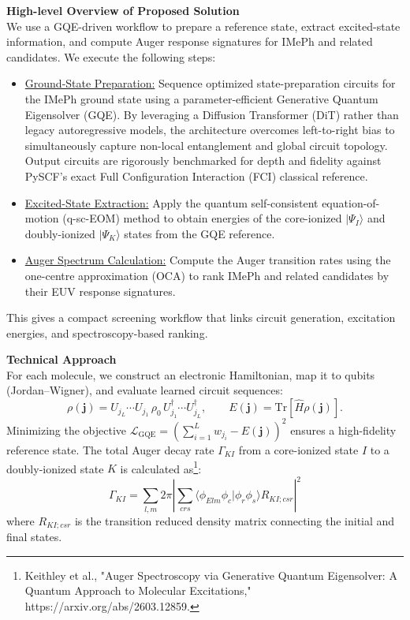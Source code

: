 \documentclass[11pt]{article}
\begin{document}
\noindent\textbf{High-level Overview of Proposed Solution}\\
We use a GQE-driven workflow to prepare a reference state, extract excited-state information, and compute Auger response signatures for IMePh and related candidates. We execute the following steps:
\begin{itemize}[leftmargin=*, itemsep=0pt, topsep=0pt, parsep=0pt, partopsep=0pt]
  \item \underline{Ground-State Preparation:} Sequence optimized state-preparation circuits for the IMePh ground state using a parameter-efficient Generative Quantum Eigensolver (GQE). By leveraging a Diffusion Transformer (DiT) rather than legacy autoregressive models, the architecture overcomes left-to-right bias to simultaneously capture non-local entanglement and global circuit topology. Output circuits are rigorously benchmarked for depth and fidelity against PySCF's exact Full Configuration Interaction (FCI) classical reference.
  \item \underline{Excited-State Extraction:} Apply the quantum self-consistent equation-of-motion (q-sc-EOM) method to obtain energies of the core-ionized $|\Psi_I\rangle$ and doubly-ionized $|\Psi_K\rangle$ states from the GQE reference.
  \item \underline{Auger Spectrum Calculation:} Compute the Auger transition rates using the one-centre approximation (OCA) to rank IMePh and related candidates by their EUV response signatures.
\end{itemize}
This gives a compact screening workflow that links circuit generation, excitation energies, and spectroscopy-based ranking.

\noindent\textbf{Technical Approach}\\
For each molecule, we construct an electronic Hamiltonian, map it to qubits (Jordan--Wigner), and evaluate learned circuit sequences:
\begin{equation*}
\rho(\mathbf{j}) = U_{j_L}\cdots U_{j_1}\,\rho_0\,U_{j_1}^{\dagger}\cdots U_{j_L}^{\dagger},
\qquad
E(\mathbf{j}) = \mathrm{Tr}\!\left[\hat{H}\rho(\mathbf{j})\right].
\end{equation*}
Minimizing the objective $\mathcal{L}_{\mathrm{GQE}} = \left(\sum_{i=1}^{L} w_{j_i} - E(\mathbf{j})\right)^2$ ensures a high-fidelity reference state. The total Auger decay rate $\Gamma_{KI}$ from a core-ionized state $I$ to a doubly-ionized state $K$ is calculated as\footnote{Keithley et al., "Auger Spectroscopy via Generative Quantum Eigensolver: A Quantum Approach to Molecular Excitations," https://arxiv.org/abs/2603.12859.}:
\begin{equation*}
\Gamma_{KI} = \sum_{l,m} 2\pi \left| \sum_{crs} \langle \phi_{Elm} \phi_c | \phi_r \phi_s \rangle R_{KI;csr} \right|^2
\end{equation*}
where $R_{KI;csr}$ is the transition reduced density matrix connecting the initial and final states. 
\end{document}
